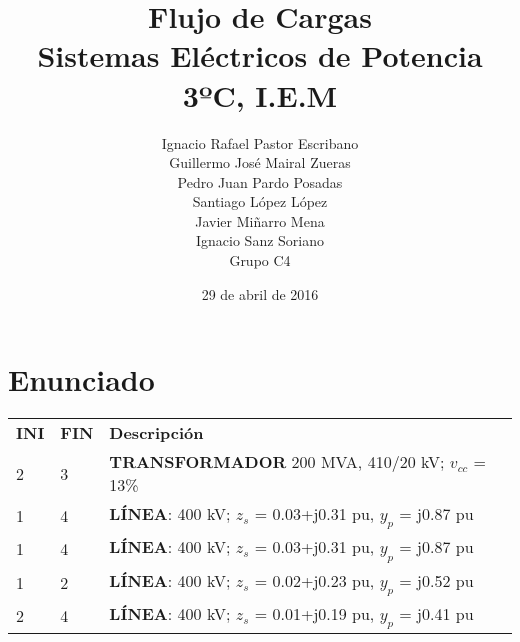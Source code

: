 \documentclass[a4paper,10pt,titlepage,oneside]{article}
\title{Flujo de Cargas\\
\small Sistemas Eléctricos de Potencia\\
\small 3ºC, I.E.M}
\author{Ignacio Rafael Pastor Escribano\\
Guillermo José Mairal Zueras\\
Pedro Juan Pardo Posadas\\
Santiago López López\\
Javier Miñarro Mena\\
Ignacio Sanz Soriano\\
Grupo C4}
\date{29 de abril de 2016}
\def\listtablename{Índice de tablas}
\begin{document}
\renewcommand{\listtablename}{Índice de Tablas}

\maketitle
\newpage
\tableofcontents
\newpage
\listoftables
\newpage

\section{Enunciado}
\begin{table}[htbp]
            \centering
            \begin{tabular}{l l l}
                \textbf{INI} &\textbf{FIN}& \textbf{Descripción}\\
                \cline{1-3}
                2 & 3 & \textbf{TRANSFORMADOR} 200 MVA, 410/20 kV; $v_{cc}$ = 13\% \\
                1 & 4 & \textbf{LÍNEA}: 400 kV; $z_s$ = 0.03+j0.31 pu, $y_p$ = j0.87 pu \\
                1 & 4 & \textbf{LÍNEA}: 400 kV; $z_s$ = 0.03+j0.31 pu, $y_p$ = j0.87 pu \\
                1 & 2 & \textbf{LÍNEA}: 400 kV; $z_s$ = 0.02+j0.23 pu, $y_p$ = j0.52 pu \\
                2 & 4 & \textbf{LÍNEA}: 400 kV; $z_s$ = 0.01+j0.19 pu, $y_p$ = j0.41 pu \\
            \end{tabular}
\end{table}
\end{document}
